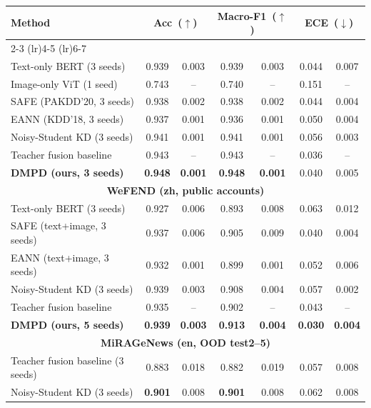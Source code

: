\begin{table}[t]
\centering
\small
\setlength{\tabcolsep}{5pt}%
\begin{tabular}{l
  c@{\,±\,}c
  c@{\,±\,}c
  c@{\,±\,}c}
\toprule
Method & \multicolumn{2}{c}{Acc~($\uparrow$)} &
  \multicolumn{2}{c}{Macro-F1~($\uparrow$)} &
  \multicolumn{2}{c}{ECE~($\downarrow$)} \\
\cmidrule(lr){2-3} \cmidrule(lr){4-5} \cmidrule(lr){6-7}
\midrule
\multicolumn{7}{c}{\textbf{Weibo (zh, text+image)}} \\ \midrule
Text-only BERT (3 seeds) & 0.939 & 0.003 & 0.939 & 0.003 & 0.044 & 0.007 \\
Image-only ViT (1 seed) & 0.743 & -- & 0.740 & -- & 0.151 & -- \\
SAFE (PAKDD'20, 3 seeds) & 0.938 & 0.002 & 0.938 & 0.002 & 0.044 & 0.004 \\
EANN (KDD'18, 3 seeds) & 0.937 & 0.001 & 0.936 & 0.001 & 0.050 & 0.004 \\
Noisy-Student KD (3 seeds) & 0.941 & 0.001 & 0.941 & 0.001 & 0.056 & 0.003 \\
Teacher fusion baseline & 0.943 & -- & 0.943 & -- & 0.036 & -- \\
\textbf{DMPD (ours, 3 seeds)} & \textbf{0.948} & \textbf{0.001} & \textbf{0.948} & \textbf{0.001} & 0.040 & 0.005 \\
\midrule
\multicolumn{7}{c}{\textbf{WeFEND (zh, public accounts)}} \\ \midrule
Text-only BERT (3 seeds) & 0.927 & 0.006 & 0.893 & 0.008 & 0.063 & 0.012 \\
SAFE (text+image, 3 seeds) & 0.937 & 0.006 & 0.905 & 0.009 & 0.040 & 0.004 \\
EANN (text+image, 3 seeds) & 0.932 & 0.001 & 0.899 & 0.001 & 0.052 & 0.006 \\
Noisy-Student KD (3 seeds) & 0.939 & 0.003 & 0.908 & 0.004 & 0.057 & 0.002 \\
Teacher fusion baseline & 0.935 & -- & 0.902 & -- & 0.043 & -- \\
\textbf{DMPD (ours, 5 seeds)} & \textbf{0.939} & \textbf{0.003} & \textbf{0.913} & \textbf{0.004} & \textbf{0.030} & \textbf{0.004} \\
\midrule
\multicolumn{7}{c}{\textbf{MiRAGeNews (en, OOD test2--5)}} \\ \midrule
Teacher fusion baseline (3 seeds) & 0.883 & 0.018 & 0.882 & 0.019 & 0.057 & 0.008 \\
Noisy-Student KD (3 seeds) & \textbf{0.901} & 0.008 & \textbf{0.901} & 0.008 & 0.062 & 0.008 \\

\end{tabular}
\end{table}

